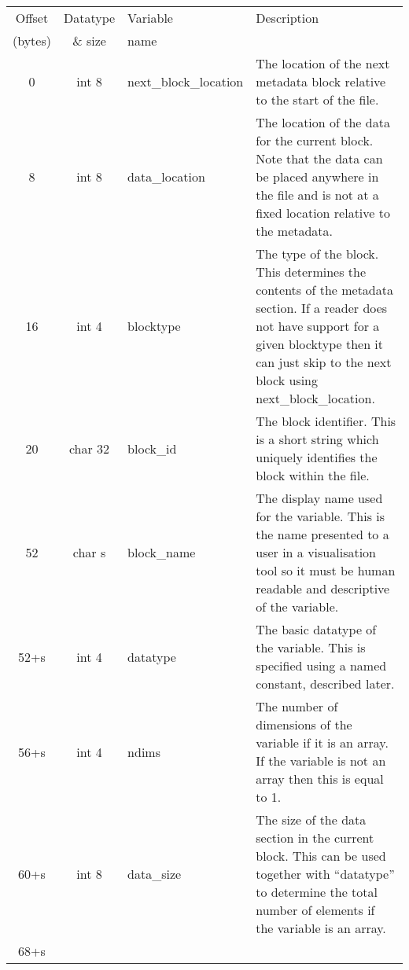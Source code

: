 \documentclass[12pt]{article}
\begin{document}
\begin{center}
\begin{tabularx}{0.9\textwidth}[!hbt]{cclX}
  Offset & Datatype & Variable & Description\\
  (bytes) & \& size & name &
  \\\toprule

  0 & int 8 & next\_block\_location & The location of the next metadata
  block relative to the start of the file.
  \\\midrule

  8 & int 8 & data\_location & The location of the data for the current block.
  Note that the data can be placed anywhere in the file and is not at a fixed
  location relative to the metadata.
  \\\midrule

  16 & int 4 & blocktype & The type of the block. This determines the contents
  of the metadata section. If a reader does not have support for a given
  blocktype then it can just skip to the next block using next\_block\_location.
  \\\midrule

  20 & char 32 & block\_id & The block identifier. This is a short string
  which uniquely identifies the block within the file.
  \\\midrule

  52 & char s & block\_name & The display name used for the variable. This
  is the name presented to a user in a visualisation tool so it must be
  human readable and descriptive of the variable.
  \\\midrule

  52+s & int 4 & datatype & The basic datatype of the variable. This is
  specified using a named constant, described later.
  \\\midrule

  56+s & int 4 & ndims & The number of dimensions of the variable if
  it is an array. If the variable is not an array then this is equal to 1.
  \\\midrule

  60+s & int 8 & data\_size & The size of the data section in the current block.
  This can be used together with ``datatype'' to determine the total number
  of elements if the variable is an array.
  \\\midrule

  68+s &
\end{tabularx}
\end{center}\vspace{10pt}
\end{document}
